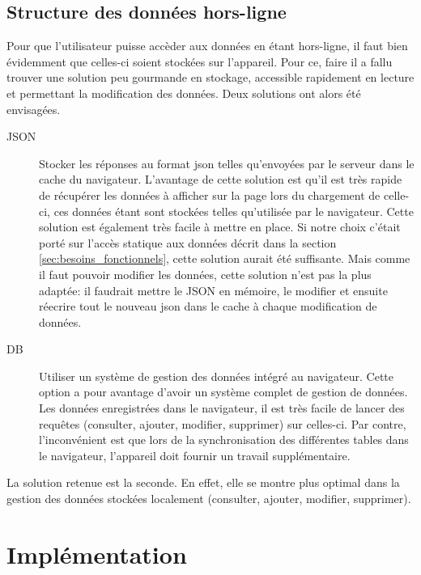 \documentclass{EPL-master-thesis-covers-FR}
\begin{document}
		\section{Structure des données hors-ligne}
			\label{sec:data}
			Pour que l'utilisateur puisse accèder aux données en étant hors-ligne, il faut bien évidemment que celles-ci soient stockées sur l'appareil. Pour ce, faire il a fallu trouver une solution peu gourmande en stockage, accessible rapidement en lecture et permettant la modification des données. Deux solutions ont alors été envisagées.
			\begin{description}
				\item[JSON] Stocker les réponses au format \gls{json} telles qu'envoyées par le serveur dans le cache du navigateur. L'avantage de cette solution est qu'il est très rapide de récupérer les données à afficher sur la page lors du chargement de celle-ci, ces données étant sont stockées telles qu'utilisée par le navigateur. Cette solution est également très facile à mettre en place. Si notre choix c'était porté sur l'accès statique aux données décrit dans la section \ref{sec:besoins_fonctionnels}, cette solution aurait été suffisante. Mais comme il faut pouvoir modifier les données, cette solution n'est pas la plus adaptée: il faudrait mettre le JSON en mémoire, le modifier et ensuite réecrire tout le nouveau \gls{json} dans le cache à chaque modification de données.
				\item[DB] Utiliser un système de gestion des données intégré au navigateur. Cette option a pour avantage d'avoir un système complet de gestion de données. Les données enregistrées dans le navigateur, il est très facile de lancer des requêtes (consulter, ajouter, modifier, supprimer) sur celles-ci. Par contre, l'inconvénient est que lors de la synchronisation des différentes tables dans le navigateur, l'appareil doit fournir un travail supplémentaire.
			\end{description}
				
			La solution retenue est la seconde. En effet, elle se montre plus optimal dans la gestion des données stockées localement (consulter, ajouter, modifier, supprimer).
			
			



	\chapter{Implémentation}
\end{document}
